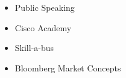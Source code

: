 	\begin{itemize}
		\item Public Speaking
		\item Cisco Academy
		\item Skill-a-bus
		\item Bloomberg Market Concepts
	\end{itemize}